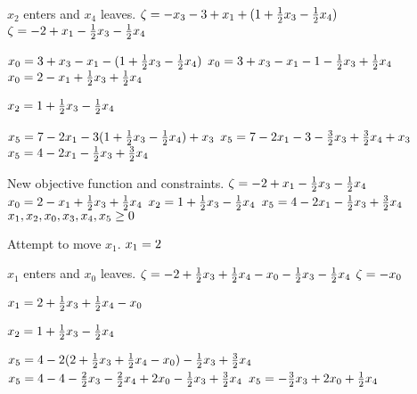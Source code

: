 \documentclass[17pt]{extarticle}
\begin{document}
\bigskip $x_2$ enters and $x_4$ leaves.
$\\ \zeta = -x_3 - 3 + x_1 + (1 + \frac{1}{2}x_3 - \frac{1}{2}x_4)$
$\\ \zeta = - 2 + x_1 - \frac{1}{2}x_3 - \frac{1}{2}x_4$

$\\ x_0 = 3 + x_3 - x_1 - (1 + \frac{1}{2}x_3 - \frac{1}{2}x_4)$
$\\ x_0 = 3 + x_3 - x_1 - 1 - \frac{1}{2}x_3 + \frac{1}{2}x_4$
$\\ x_0 = 2 - x_1 + \frac{1}{2}x_3 + \frac{1}{2}x_4$

$\\ x_2 = 1 + \frac{1}{2}x_3 - \frac{1}{2}x_4$

$\\ x_5 = 7 - 2x_1 - 3(1 + \frac{1}{2}x_3 - \frac{1}{2}x_4) + x_3$
$\\ x_5 = 7 - 2x_1 - 3 - \frac{3}{2}x_3 + \frac{3}{2}x_4 + x_3$
$\\ x_5 = 4 - 2x_1 - \frac{1}{2}x_3 + \frac{3}{2}x_4$

\bigskip New objective function and constraints.
$\\ \zeta = - 2 + x_1 - \frac{1}{2}x_3 - \frac{1}{2}x_4$
$\\ x_0 = 2 - x_1 + \frac{1}{2}x_3 + \frac{1}{2}x_4$
$\\ x_2 = 1 + \frac{1}{2}x_3 - \frac{1}{2}x_4$
$\\ x_5 = 4 - 2x_1 - \frac{1}{2}x_3 + \frac{3}{2}x_4$
$\\ x_1, x_2, x_0, x_3, x_4, x_5 \geq 0$

\bigskip Attempt to move $x_1$.
$\\x_1 = 2$

\bigskip $x_1$ enters and $x_0$ leaves.
$\\ \zeta = - 2 + \frac{1}{2}x_3 + \frac{1}{2}x_4 - x_0 - \frac{1}{2}x_3 - \frac{1}{2}x_4$
$\\ \zeta = - x_0$

$\\ x_1 = 2 + \frac{1}{2}x_3 + \frac{1}{2}x_4 - x_0$

$\\ x_2 = 1 + \frac{1}{2}x_3 - \frac{1}{2}x_4$

$\\ x_5 = 4 - 2(2 + \frac{1}{2}x_3 + \frac{1}{2}x_4 - x_0) - \frac{1}{2}x_3 + \frac{3}{2}x_4$
$\\ x_5 = 4 - 4 - \frac{2}{2}x_3 - \frac{2}{2}x_4 + 2x_0 - \frac{1}{2}x_3 + \frac{3}{2}x_4$
$\\ x_5 = - \frac{3}{2}x_3 + 2x_0 + \frac{1}{2}x_4$
\end{document}
